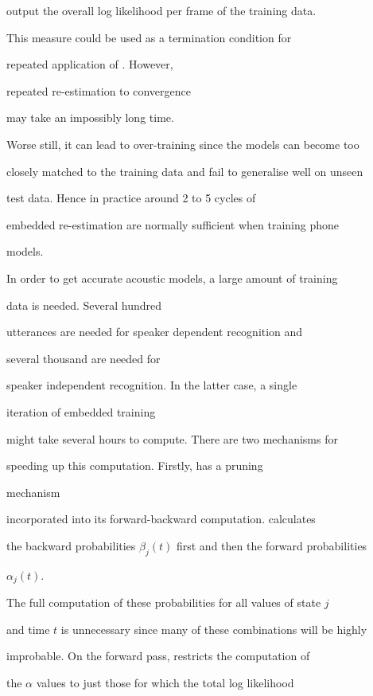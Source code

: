 output the overall log likelihood per frame of the training data.


This measure could be used as a termination condition for


repeated application of .  However, 


repeated re-estimation to convergence 


may take an impossibly long time.


Worse still, it can lead to over-training since the models can become too


closely matched to the training data and fail to generalise well on unseen


test data.  Hence in practice around 2 to 5 cycles of 


embedded re-estimation are normally sufficient when training phone


models.





In order to get accurate acoustic models, a large amount of training


data is needed.  Several hundred


utterances are needed for speaker dependent recognition and


several thousand are needed for


speaker independent recognition.  In the latter case, a single


iteration of embedded training


might take several hours to compute.  There are two mechanisms for 


speeding up this computation.  Firstly,  has a pruning


 mechanism


incorporated into its forward-backward computation.   calculates


the backward probabilities $\beta_j(t)$ first and then the forward probabilities


$\alpha_j(t)$.


The full computation of these probabilities for all values of state $j$


and time $t$ is unnecessary since many of these combinations will be highly


improbable.   On the forward pass,  restricts the computation of


the $\alpha$ values to just those for which the total log likelihood 


